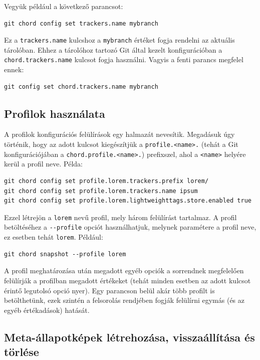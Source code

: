 \documentclass[
]{elteikthesis}[2025/03/25]
\begin{document}
Vegyük például a következő parancsot:

\begin{verbatim}
git chord config set trackers.name mybranch
\end{verbatim}

Ez a \verb|trackers.name| kulcshoz a \verb|mybranch| értéket fogja rendelni az aktuális tárolóban.
Ehhez a tárolóhoz tartozó Git által kezelt konfigurációban a \verb|chord.trackers.name| kulcsot fogja használni.
Vagyis a fenti parancs megfelel ennek:

\begin{verbatim}
git config set chord.trackers.name mybranch
\end{verbatim}

\subsection{Profilok használata} \label{subsec:profiles}

A profilok konfigurációs felülírások egy halmazát nevesítik.
Megadásuk úgy történik, hogy az adott kulcsot kiegészítjük a \verb|profile.<name>.|
(tehát a Git konfigurációjában a \verb|chord.profile.<name>.|) prefixszel,
ahol a \verb|<name>| helyére kerül a profil neve.
Példa:

\begin{verbatim}
git chord config set profile.lorem.trackers.prefix lorem/
git chord config set profile.lorem.trackers.name ipsum
git chord config set profile.lorem.lightweighttags.store.enabled true
\end{verbatim}

Ezzel létrejön a \verb|lorem| nevű profil, mely három felülírást tartalmaz.
A profil betöltéséhez a \verb|--profile| opciót használhatjuk,
melynek paramétere a profil neve, ez esetben tehát \verb|lorem|.
Például:

\begin{verbatim}
git chord snapshot --profile lorem
\end{verbatim}

A profil meghatározása után megadott egyéb opciók a sorrendnek megfelelően
felülírják a profilban megadott értékeket
(tehát minden esetben az adott kulcsot érintő legutolsó opció nyer).
Egy parancson belül akár több profilt is betölthetünk,
ezek szintén a felsorolás rendjében fogják felülírni egymás (és az egyéb értékadások) hatását.

\subsection{Meta-állapotképek létrehozása, visszaállítása és törlése}
\end{document}
